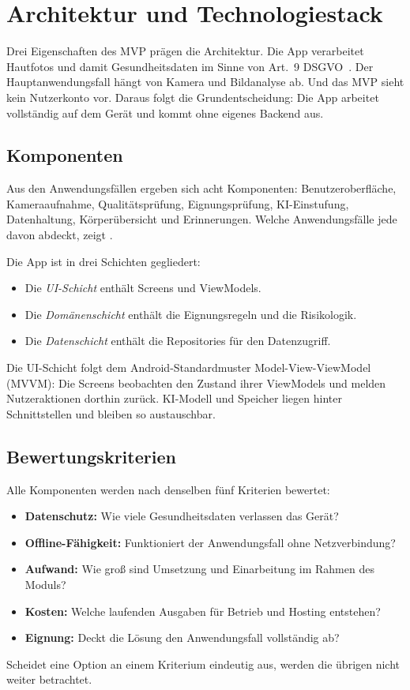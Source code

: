 \section{Architektur und Technologiestack}
\label{chap:architektur}

Drei Eigenschaften des MVP prägen die Architektur. Die App verarbeitet Hautfotos und damit Gesundheitsdaten im Sinne von Art.~9 DSGVO~\cite{dsgvo}. Der Hauptanwendungsfall hängt von Kamera und Bildanalyse ab. Und das MVP sieht kein Nutzerkonto vor. Daraus folgt die Grundentscheidung: Die App arbeitet vollständig auf dem Gerät und kommt ohne eigenes Backend aus.

\subsection{Komponenten}

Aus den Anwendungsfällen ergeben sich acht Komponenten: Benutzeroberfläche, Kameraaufnahme, Qualitätsprüfung, Eignungsprüfung, KI-Einstufung, Datenhaltung, Körperübersicht und Erinnerungen. Welche Anwendungsfälle jede davon abdeckt, zeigt .

Die App ist in drei Schichten gegliedert:
\begin{itemize}
\item Die \emph{UI-Schicht} enthält Screens und ViewModels.
\item Die \emph{Domänenschicht} enthält die Eignungsregeln und die Risikologik.
\item Die \emph{Datenschicht} enthält die Repositories für den Datenzugriff.
\end{itemize}
Die UI-Schicht folgt dem Android-Standardmuster Model-View-ViewModel (MVVM): Die Screens beobachten den Zustand ihrer ViewModels und melden Nutzeraktionen dorthin zurück. KI-Modell und Speicher liegen hinter Schnittstellen und bleiben so austauschbar.

\subsection{Bewertungskriterien}

Alle Komponenten werden nach denselben fünf Kriterien bewertet:
\begin{itemize}
\item \textbf{Datenschutz:} Wie viele Gesundheitsdaten verlassen das Gerät?
\item \textbf{Offline-Fähigkeit:} Funktioniert der Anwendungsfall ohne Netzverbindung?
\item \textbf{Aufwand:} Wie groß sind Umsetzung und Einarbeitung im Rahmen des Moduls?
\item \textbf{Kosten:} Welche laufenden Ausgaben für Betrieb und Hosting entstehen?
\item \textbf{Eignung:} Deckt die Lösung den Anwendungsfall vollständig ab?
\end{itemize}
Scheidet eine Option an einem Kriterium eindeutig aus, werden die übrigen nicht weiter betrachtet.

